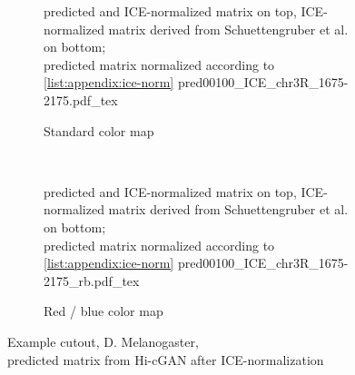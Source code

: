 \begin{figure}[ptb]%
 \begin{subfigure}{\textwidth}
  \centering\scriptsize{predicted and ICE-normalized matrix on top, ICE-normalized matrix derived from Schuettengruber et al. \cite{Schuettengruber2014} on bottom;\\
                                        predicted matrix normalized according to \cref{list:appendix:ice-norm}}
  \centering
  \scriptsize
  {pred00100_ICE_chr3R_1675-2175.pdf_tex}
  \caption{Standard color map}
 \end{subfigure}\\[6mm]
\begin{subfigure}{\textwidth}
 \centering\scriptsize{predicted and ICE-normalized matrix on top, ICE-normalized matrix derived from Schuettengruber et al. \cite{Schuettengruber2014} on bottom;\\
                                        predicted matrix normalized according to \cref{list:appendix:ice-norm}}
  \centering
  \scriptsize
  {pred00100_ICE_chr3R_1675-2175_rb.pdf_tex}
  \caption{Red / blue color map}
 \end{subfigure}
 \caption[Example cutout, D. Melanogaster, predicted matrix from Hi-cGAN after ICE-normalization]{Example cutout, D. Melanogaster,\\predicted matrix from Hi-cGAN after ICE-normalization}
 \label{fig:appendix:farre-vs-ours_ours-ice-normalized}
\end{figure}

\clearpage

